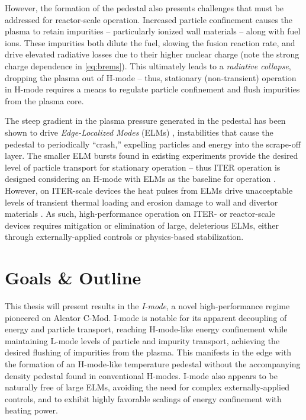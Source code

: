 However, the formation of the pedestal also presents challenges that must be addressed for reactor-scale operation.  Increased particle confinement causes the plasma to retain impurities -- particularly ionized wall materials -- along with fuel ions.  These impurities both dilute the fuel, slowing the fusion reaction rate, and drive elevated radiative losses due to their higher nuclear charge (note the strong charge dependence in \cref{eq:brems}).  This ultimately leads to a \emph{radiative collapse}, dropping the plasma out of H-mode -- thus, stationary (\ie non-transient) operation in H-mode requires a means to regulate particle confinement and flush impurities from the plasma core.  

The steep gradient in the plasma pressure generated in the pedestal has been shown to drive \emph{Edge-Localized Modes} (ELMs) \cite{Zohm1996}, instabilities that cause the pedestal to periodically ``crash,'' expelling particles and energy into the scrape-off layer.  The smaller ELM bursts found in existing experiments provide the desired level of particle transport for stationary operation -- thus ITER operation is designed considering an H-mode with ELMs as the baseline for operation \cite{ITER1999,Shimada2007}.  However, on ITER-scale devices the heat pulses from ELMs drive unacceptable levels of transient thermal loading and erosion damage to wall and divertor materials \cite{Loarte2003,Federici2003}.  As such, high-performance operation on ITER- or reactor-scale devices requires mitigation or elimination of large, deleterious ELMs, either through externally-applied controls or physics-based stabilization.\nicesectionending


\section{Goals \& Outline}\label{sec:intro_outline}

This thesis will present results in the \emph{I-mode}, a novel high-performance regime pioneered on Alcator C-Mod.  I-mode is notable for its apparent decoupling of energy and particle transport, reaching H-mode-like energy confinement while maintaining L-mode levels of particle and impurity transport, achieving the desired flushing of impurities from the plasma.  This manifests in the edge with the formation of an H-mode-like temperature pedestal without the accompanying density pedestal found in conventional H-modes.  I-mode also appears to be naturally free of large ELMs, avoiding the need for complex externally-applied controls, and to exhibit highly favorable scalings of energy confinement with heating power.

